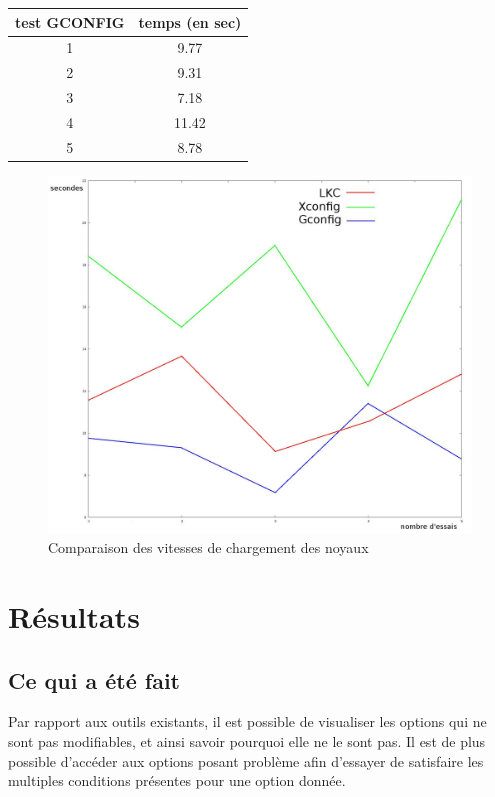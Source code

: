 \documentclass[16pts]{report}
\begin{document}
\begin{tabular}{|c|c|}
\hline
test GCONFIG & temps (en sec) \\
\hline
\hline
1 &  9.77 \\
\hline
2 & 9.31 \\
\hline
3 & 7.18 \\
\hline
4 & 11.42 \\
\hline
5 & 8.78 \\
\hline
\end{tabular}

\begin{figure}[H]
    \includegraphics[scale=0.5]{./illustrations/speed_cmp.jpeg}
    \centering
    \caption{Comparaison des vitesses de chargement des noyaux}
    \label{fig:VitesseChargement}
\end{figure}


\chapter{Résultats}
\label{cha:Résultats}
    \section{Ce qui a été fait}
    \label{sec:Ce qui a été fait}

    Par rapport aux outils existants, il est possible de visualiser les options
    qui ne sont pas modifiables, et ainsi savoir pourquoi elle ne le sont pas.
    Il est de plus possible d'accéder aux options posant problème afin
    d'essayer de satisfaire les multiples conditions présentes pour une option
    donnée.
\end{document}

